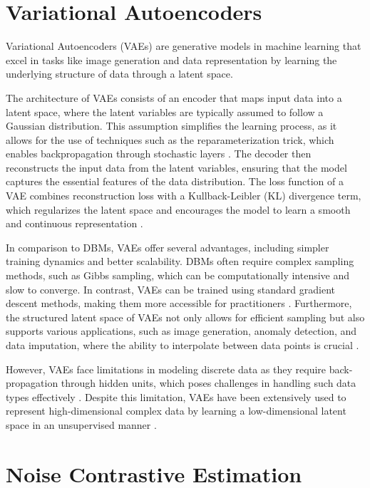 \section*{Variational Autoencoders}
Variational Autoencoders (VAEs) are generative models in machine learning that excel in tasks like image generation and data 
representation by learning the underlying structure of data through a latent space. 

The architecture of VAEs consists of an encoder that maps input data into a latent space, where the latent variables are 
typically assumed to follow a Gaussian distribution. This assumption simplifies the learning process, as it allows for 
the use of techniques such as the reparameterization trick, which enables backpropagation through stochastic layers \citep{10.1561/2200000056}. 
The decoder then reconstructs the input data from the latent variables, ensuring that the model captures the essential 
features of the data distribution. The loss function of a VAE combines reconstruction loss with a Kullback-Leibler (KL) 
divergence term, which regularizes the latent space and encourages the model to learn a smooth and continuous representation \citep{10.3390/jimaging4020036}.

In comparison to DBMs, VAEs offer several advantages, including simpler training dynamics and better scalability. DBMs 
often require complex sampling methods, such as Gibbs sampling, which can be computationally intensive and slow to converge. 
In contrast, VAEs can be trained using standard gradient descent methods, making them more accessible for 
practitioners \citep{10.1561/2200000056}\citep{10.1109/access.2020.2977671}. Furthermore, the structured latent space of 
VAEs not only allows for efficient sampling but also supports various applications, such as image generation, anomaly detection, 
and data imputation, where the ability to interpolate between data points is crucial \citep{10.1088/2632-2153/ab80b7}\citep{10.48550/arxiv.2002.10464}.

However, VAEs face limitations in modeling discrete data as they require back-propagation through hidden units, which poses challenges 
in handling such data types effectively \citep{10.48550/arxiv.1909.13062}. Despite this limitation, VAEs have been extensively used to 
represent high-dimensional complex data by learning a low-dimensional latent space in an unsupervised manner \citep{10.48550/arxiv.2106.06500}.


\section*{Noise Contrastive Estimation}


